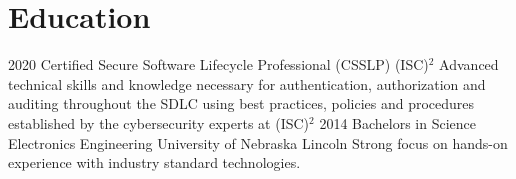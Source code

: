 \documentclass[]{src/friggeri-cv}
\begin{document}
\section{Education}
\begin{entrylist}
  \entry
    {2020}
    {Certified Secure Software Lifecycle Professional (CSSLP)}
    {(ISC)\color{pblue}\(^2\)}
    {Advanced technical skills and knowledge necessary for authentication, authorization and auditing throughout the SDLC using best practices, policies and procedures established by the cybersecurity experts at (ISC)\(^2\)}
  \entry
    {2014}
    {Bachelors in Science Electronics Engineering}
    {University of Nebraska Lincoln}
    {Strong focus on hands-on experience with industry standard technologies.}
\end{entrylist}
\end{document}
